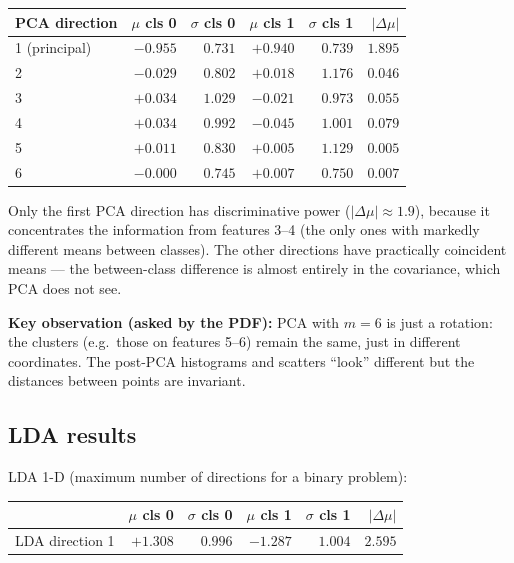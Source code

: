 \documentclass[11pt,a4paper]{article}
\begin{document}
\begin{table}[H]
\centering
\small
\begin{tabular}{lrrrrr}
\toprule
PCA direction   & $\mu$ cls 0 & $\sigma$ cls 0 & $\mu$ cls 1 & $\sigma$ cls 1 & $|\Delta\mu|$ \\
\midrule
1 (principal)   & $-0.955$ & $0.731$ & $+0.940$ & $0.739$ & $\mathbf{1.895}$ \\
2               & $-0.029$ & $0.802$ & $+0.018$ & $1.176$ & $0.046$ \\
3               & $+0.034$ & $1.029$ & $-0.021$ & $0.973$ & $0.055$ \\
4               & $+0.034$ & $0.992$ & $-0.045$ & $1.001$ & $0.079$ \\
5               & $+0.011$ & $0.830$ & $+0.005$ & $1.129$ & $0.005$ \\
6               & $-0.000$ & $0.745$ & $+0.007$ & $0.750$ & $0.007$ \\
\bottomrule
\end{tabular}
\end{table}

Only the first PCA direction has discriminative power
($|\Delta\mu| \approx 1.9$), because it concentrates the information
from features 3--4 (the only ones with markedly different means
between classes). The other directions have practically coincident
means --- the between-class difference is almost entirely in the
covariance, which PCA does not see.

\textbf{Key observation (asked by the PDF):} PCA with $m=6$ is just a
rotation: the clusters (e.g.\ those on features 5--6) remain the same,
just in different coordinates. The post-PCA histograms and scatters
``look'' different but the distances between points are invariant.

\subsection{LDA results}

LDA 1-D (maximum number of directions for a binary problem):

\begin{table}[H]
\centering
\small
\begin{tabular}{lrrrrr}
\toprule
                & $\mu$ cls 0 & $\sigma$ cls 0 & $\mu$ cls 1 & $\sigma$ cls 1 & $|\Delta\mu|$ \\
\midrule
LDA direction 1 & $+1.308$ & $0.996$ & $-1.287$ & $1.004$ & $\mathbf{2.595}$ \\
\bottomrule
\end{tabular}
\end{table}
\end{document}
